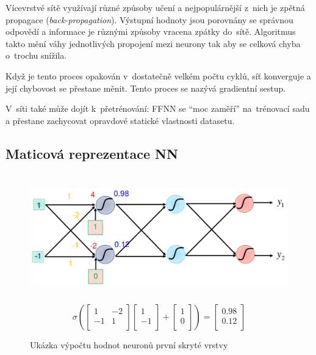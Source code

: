 Vícevrstvé sítě využívají různé způsoby učení a nejpopulárnější z~nich je zpětná propagace (\emph{back-propagation}).
Výstupní hodnoty jsou porovnány se správnou odpovědí a informace je různými způsoby vracena zpátky do~sítě.
Algoritmus takto mění váhy jednotlivých propojení mezi neurony tak aby se celková chyba o~trochu snížila.

Když je tento proces opakován v~dostatečně velkém počtu cyklů, síť konverguje a její chybovost se přestane měnit.
Tento proces se nazývá gradientní sestup.

V~síti také může dojít k~přetrénování: FFNN se \enquote{moc zaměří} na~trénovací sadu a přestane zachycovat opravdové statické vlastnosti datasetu.

\subsection{Maticová reprezentace NN}

\begin{figure}[ht]
    \onehalfspacing
    \centering
    \includegraphics[height=15em]{images/6_maticova-operace}
    $$
    \sigma \left( \left[ \begin{matrix}
    1 & -2 \\
    -1 & 1 \\
    \end{matrix} \right] \left[ \begin{matrix}
    1 \\
    -1 \\
    \end{matrix} \right] + \left[ \begin{matrix}
    1 \\
    0 \\
    \end{matrix} \right] \right) =  \left[ \begin{matrix}
    0.98 \\
    0.12 \\
    \end{matrix} \right]
    $$
    \caption{Ukázka výpočtu hodnot neuronů první skryté vrstvy}
\end{figure}
\FloatBarrier

